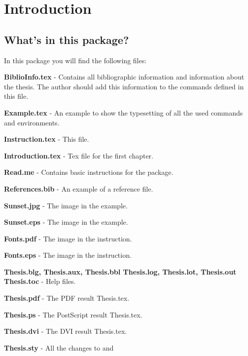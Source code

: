 
\chapter{Introduction}
\section{What's in this package?}
In this package you will find the following files:
\vspace{1em}
\begin{simplelist}
    \item \textbf{BiblioInfo.tex} - Contains all bibliographic
      information and information about the thesis. The author
      should add this information to the commands defined in this
      file. 
    \item \textbf{Example.tex} - An example to show the
      typesetting of all the used commands and environments. 
    \item \textbf{Instruction.tex} - This file.
    \item \textbf{Introduction.tex} - Tex file for the first
      chapter. 
    \item \textbf{Read.me} - Contains basic instructions for the
      package. 
    \item \textbf{References.bib} - An example of a reference
      file. 
    \item \textbf{Sunset.jpg} - The image in the example.
    \item \textbf{Sunset.eps} - The image in the example.
    \item \textbf{Fonts.pdf} - The image in the instruction.
    \item \textbf{Fonts.eps} - The image in the instruction.    
    \item \textbf{Thesis.blg, Thesis.aux, Thesis.bbl Thesis.log,
        Thesis.lot, Thesis.out Thesis.toc} - Help files. 
    \item \textbf{Thesis.pdf} - The PDF result Thesis.tex. 
    \item \textbf{Thesis.ps} - The PostScript result Thesis.tex. 
    \item \textbf{Thesis.dvi} - The DVI result Thesis.tex. 
    \item \textbf{Thesis.sty} - All the changes to and

\end{simplelist}
